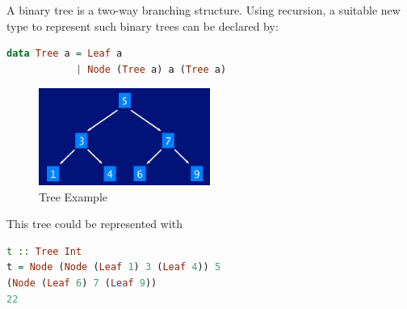 A binary tree is a two-way branching structure. Using recursion, a
suitable new type to represent such binary trees can be declared by:

\begin{lstlisting}[language=Haskell]
data Tree a = Leaf a
            | Node (Tree a) a (Tree a)
\end{lstlisting}

\begin{figure}[H]
\centering
\includegraphics[width=0.5\textwidth]{figures/binaryTreeExample.png}
\caption{Tree Example}
\end{figure}

This tree could be represented with

\begin{lstlisting}[language=Haskell]
t :: Tree Int
t = Node (Node (Leaf 1) 3 (Leaf 4)) 5
(Node (Leaf 6) 7 (Leaf 9))
22
\end{lstlisting}

\clearpage